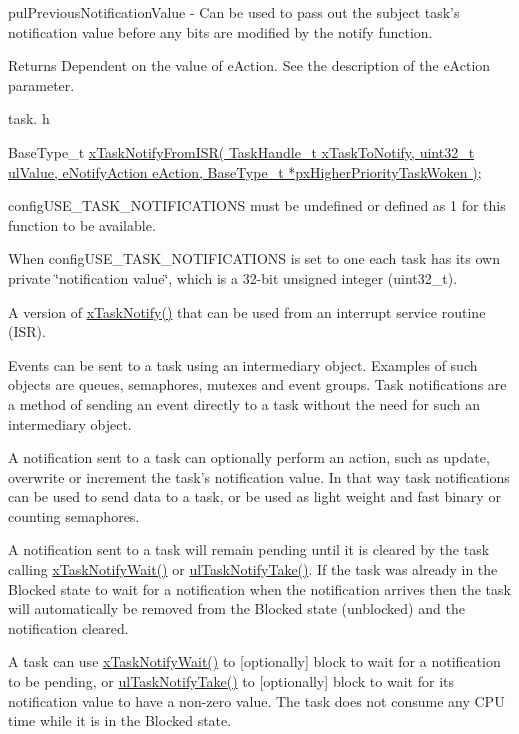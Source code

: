 pul\-Previous\-Notification\-Value -\/ Can be used to pass out the subject task's notification value before any bits are modified by the notify function.

\begin{DoxyReturn}{Returns}
Dependent on the value of e\-Action. See the description of the e\-Action parameter.
\end{DoxyReturn}
task. h 
\begin{DoxyPre}BaseType\_t \hyperlink{task_8h_a1ed9129068b96a909356bd0369c5ecb0}{xTaskNotifyFromISR( TaskHandle\_t xTaskToNotify, uint32\_t ulValue, eNotifyAction eAction, BaseType\_t *pxHigherPriorityTaskWoken )};\end{DoxyPre}


config\-U\-S\-E\-\_\-\-T\-A\-S\-K\-\_\-\-N\-O\-T\-I\-F\-I\-C\-A\-T\-I\-O\-N\-S must be undefined or defined as 1 for this function to be available.

When config\-U\-S\-E\-\_\-\-T\-A\-S\-K\-\_\-\-N\-O\-T\-I\-F\-I\-C\-A\-T\-I\-O\-N\-S is set to one each task has its own private \char`\"{}notification value\char`\"{}, which is a 32-\/bit unsigned integer (uint32\-\_\-t).

A version of \hyperlink{task_8h_a0d2d54fb8a64011dfbb54983e4ed06bd}{x\-Task\-Notify()} that can be used from an interrupt service routine (I\-S\-R).

Events can be sent to a task using an intermediary object. Examples of such objects are queues, semaphores, mutexes and event groups. Task notifications are a method of sending an event directly to a task without the need for such an intermediary object.

A notification sent to a task can optionally perform an action, such as update, overwrite or increment the task's notification value. In that way task notifications can be used to send data to a task, or be used as light weight and fast binary or counting semaphores.

A notification sent to a task will remain pending until it is cleared by the task calling \hyperlink{task_8h_a0475fcda9718f403521c270a7270ff93}{x\-Task\-Notify\-Wait()} or \hyperlink{task_8h_a66540bef602522a01a519f776e4c07d8}{ul\-Task\-Notify\-Take()}. If the task was already in the Blocked state to wait for a notification when the notification arrives then the task will automatically be removed from the Blocked state (unblocked) and the notification cleared.

A task can use \hyperlink{task_8h_a0475fcda9718f403521c270a7270ff93}{x\-Task\-Notify\-Wait()} to \mbox{[}optionally\mbox{]} block to wait for a notification to be pending, or \hyperlink{task_8h_a66540bef602522a01a519f776e4c07d8}{ul\-Task\-Notify\-Take()} to \mbox{[}optionally\mbox{]} block to wait for its notification value to have a non-\/zero value. The task does not consume any C\-P\-U time while it is in the Blocked state.

